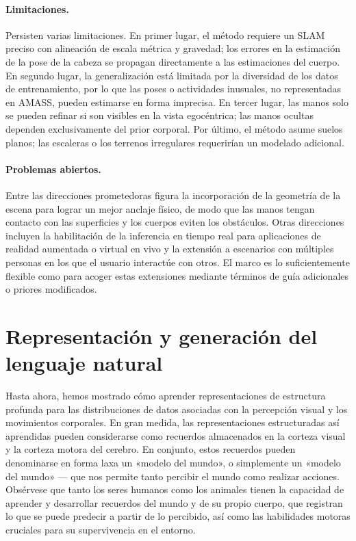 \documentclass[../../book-main_es.tex]{subfiles}
\begin{document}
\paragraph{Limitaciones.}
Persisten varias limitaciones. En primer lugar, el método requiere un SLAM preciso
con alineación de escala métrica y gravedad; los errores en la estimación de la pose de la cabeza
se propagan directamente a las estimaciones del cuerpo. En segundo lugar,
la generalización está limitada por la diversidad de los datos de entrenamiento, por lo que las poses o actividades inusuales,
no representadas en AMASS, pueden estimarse en forma imprecisa.
En tercer lugar, las manos solo se pueden refinar si son visibles en la vista egocéntrica;
las manos ocultas dependen exclusivamente del prior corporal. Por último, el método
asume suelos planos; las escaleras o los terrenos irregulares requerirían
un modelado adicional.

\paragraph{Problemas abiertos.}
Entre las direcciones prometedoras figura la incorporación de la geometría de la escena para lograr un mejor
anclaje físico, de modo que las manos tengan contacto con las superficies y los cuerpos
eviten los obstáculos. Otras direcciones incluyen la habilitación de la inferencia en tiempo real
para aplicaciones de realidad aumentada o virtual en vivo y la extensión a escenarios con múltiples personas
en los que el usuario interactúe con otros. El marco es
lo suficientemente flexible como para acoger estas extensiones mediante términos de guía adicionales
o priores modificados.

\section{Representación y generación del lenguaje natural}\label{sec:clm_text}
Hasta ahora, hemos mostrado cómo aprender representaciones de estructura profunda 
para las distribuciones de datos asociadas con la percepción visual y
los movimientos corporales. En gran medida, las representaciones estructuradas así aprendidas
pueden considerarse como recuerdos almacenados en la corteza visual
y la corteza motora del cerebro. En conjunto, estos recuerdos pueden denominarse en forma laxa
un «modelo del mundo», o simplemente un «modelo del mundo» --- que nos permite 
tanto percibir el mundo como realizar acciones. Obsérvese que
tanto los seres humanos como los animales tienen la capacidad de aprender y desarrollar
recuerdos del mundo y de su propio cuerpo, que registran lo que se puede
predecir a partir de lo percibido, así como las habilidades motoras cruciales para
su supervivencia en el entorno.
\end{document}
